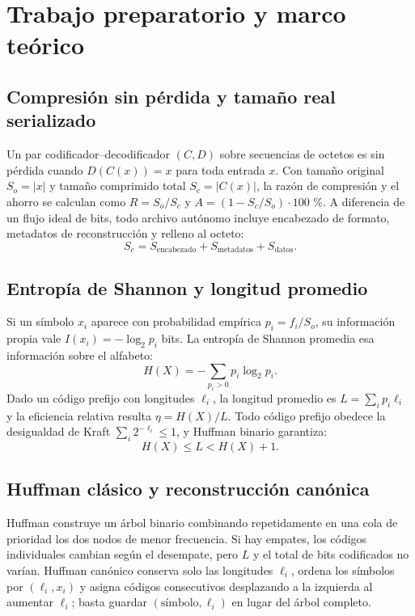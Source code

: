 \section{Trabajo preparatorio y marco teórico}

\subsection{Compresión sin pérdida y tamaño real serializado}
Un par codificador--decodificador $(C,D)$ sobre secuencias de octetos es sin pérdida cuando $D(C(x))=x$ para toda entrada $x$. Con tamaño original $S_o=|x|$ y tamaño comprimido total $S_c=|C(x)|$, la razón de compresión y el ahorro se calculan como $R=S_o/S_c$ y $A=(1-S_c/S_o)\cdot 100\text{ \%}$. A diferencia de un flujo ideal de bits, todo archivo autónomo incluye encabezado de formato, metadatos de reconstrucción y relleno al octeto:
\begin{equation}
S_c = S_{\text{encabezado}} + S_{\text{metadatos}} + S_{\text{datos}}.
\end{equation}

\subsection{Entropía de Shannon y longitud promedio}
Si un símbolo $x_i$ aparece con probabilidad empírica $p_i=f_i/S_o$, su información propia vale $I(x_i)=-\log_2 p_i$ bits. La entropía de Shannon promedia esa información sobre el alfabeto:
\begin{equation}
H(X) = -\sum_{p_i > 0} p_i \log_2 p_i.
\end{equation}
Dado un código prefijo con longitudes $\ell_i$, la longitud promedio es $L=\sum_i p_i\ell_i$ y la eficiencia relativa resulta $\eta=H(X)/L$. Todo código prefijo obedece la desigualdad de Kraft $\sum_i 2^{-\ell_i}\le 1$, y Huffman binario garantiza:
\begin{equation}
H(X) \le L < H(X) + 1.
\end{equation}

\subsection{Huffman clásico y reconstrucción canónica}
Huffman construye un árbol binario combinando repetidamente en una cola de prioridad los dos nodos de menor frecuencia. Si hay empates, los códigos individuales cambian según el desempate, pero $L$ y el total de bits codificados no varían. Huffman canónico conserva solo las longitudes $\ell_i$, ordena los símbolos por $(\ell_i, x_i)$ y asigna códigos consecutivos desplazando a la izquierda al aumentar $\ell_i$; basta guardar $(\text{símbolo},\ell_i)$ en lugar del árbol completo.

